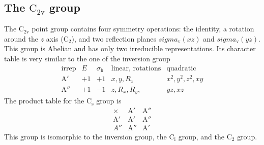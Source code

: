 \documentclass[../Main/chem532-notes.tex]{subfiles}
\begin{document}
\subsection{The $\mathrm{C_{2v}}$ group}
The $\mathrm{C_{2v}}$ point group contains four symmetry operations: the identity, a rotation around the $z$ axis ($\mathrm{C_{2}}$), and two   reflection planes $sigma_\mathrm{v}(xz)$ and $sigma_\mathrm{v}(yz)$.
This group is Abelian and has only two irreducible representations.
Its character table is very similar to the one of the inversion group
\begin{equation}
   \begin{array}{c|cccc}
          \text{irrep} & E & \sigma_\mathrm{h} & \text{linear, rotations} &  \text{quadratic} \\
   \hline
     \mathrm{A}' & +1 & +1 & x,y, R_z & x^2, y^2, z^2, xy\\
     \mathrm{A}'' & +1 & -1 & z, R_x, R_y, & yz, xz
   \end{array}
\end{equation}
The product table for the $\mathrm{C_s}$ group is
\begin{equation}
   \begin{array}{c|cc} %
        \times  &\mathrm{A}'  & \mathrm{A}'' \\
   \hline
     \mathrm{A}'  & \mathrm{A}' & \mathrm{A}'' \\
      {A}'' & \mathrm{A}'' & \mathrm{A}' 
   \end{array}
\end{equation}
This group is isomorphic to the inversion group, the $\mathrm{C_i}$ group, and the $\mathrm{C_2}$ group.
\end{document}
